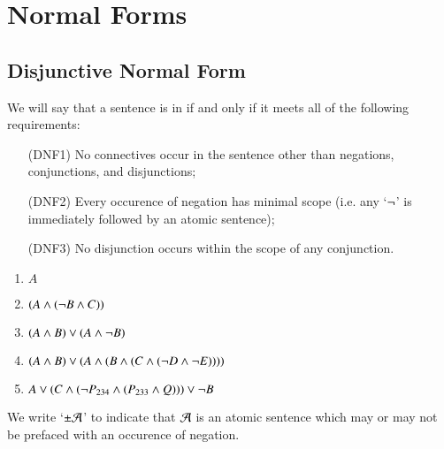 %
%
%
\chapter{Normal Forms}
\label{NorForms} %

\section{ Disjunctive Normal Form}

\begin{definition}
    We will say that a sentence is in  if and only if it meets all of the following requirements: \begin{itemize}[leftmargin=+1in]
        \item[(DNF1)] No connectives occur in the sentence other than negations, conjunctions, and disjunctions;
        \item[(DNF2)] Every occurence of negation has minimal scope (i.e. any `$\neg$' is immediately followed by an atomic sentence);
        \item[(DNF3)] No disjunction occurs within the scope of any conjunction.
    \end{itemize}
\end{definition}

\begin{example}
    \leavevmode
    \begin{enumerate}
        \item $A$
        \item $(A\wedge (\neg B\wedge C))$
        \item $(A\wedge B)\vee (A\wedge \neg B)$
        \item $(A\wedge B)\vee(A\wedge (B\wedge(C\wedge(\neg D\wedge\neg E))))$
        \item $A\vee (C\wedge(\neg P_{234}\wedge (P_{233}\wedge Q)))\vee \neg B$
    \end{enumerate}
\end{example}

\begin{note}
    We write `$\pm\mathcal{A}$' to indicate that $\mathcal{A}$ is an atomic sentence which may or may not be prefaced with an occurence of negation. 
\end{note}

